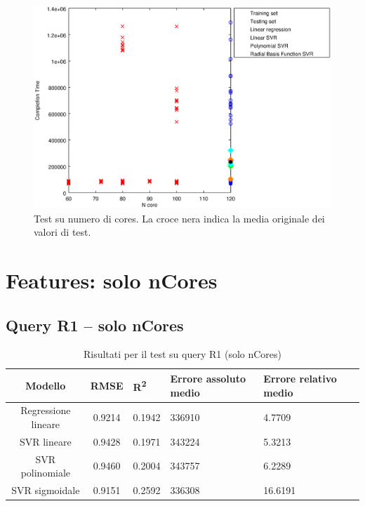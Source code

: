 \documentclass[a4paper,11pt]{article}
\begin{document}
\begin {figure}[hbtp]
\centering
\includegraphics[width=\textwidth]{outputPlots/plot_Ncore.eps}
\caption {Test su numero di cores. La croce nera indica la media originale dei valori di test.}
\end {figure}

\newpage
\section{Features: solo nCores}
\subsection{Query R1 -- solo nCores}
\begin{table}[bhpt]
	\centering
	\begin{adjustbox}{center}
		\begin{tabular}{c | c M{1.2cm} M{2.5cm} M{2.5cm} M{1.8cm}}
			Modello & RMSE & R\textsuperscript{2} & Errore assoluto medio & Errore relativo medio \tabularnewline
			\hline
			Regressione lineare & 0.9214 & 0.1942 & 336910 & 4.7709 \\
			SVR lineare & 0.9428 & 0.1971 & 343224 & 5.3213 \\
			SVR polinomiale & 0.9460 & 0.2004 & 343757 & 6.2289 \\
			SVR sigmoidale & 0.9151 & 0.2592 & 336308 & 16.6191 \\
		\end{tabular}
	\end{adjustbox}
	\\
	\caption{Risultati per il test su query R1 
(solo nCores)}
	\label{table_R1_nCores}
\end{table}
\end{document}
